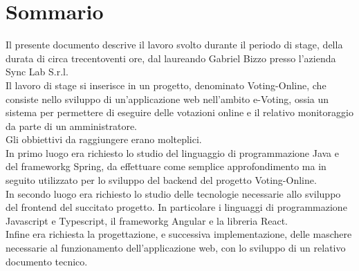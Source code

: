 
\cleardoublepage
{}
{}
\begingroup
\let\clearpage\relax
\let\cleardoublepage\relax
\let\cleardoublepage\relax

\chapter*{Sommario}

Il presente documento descrive il lavoro svolto durante il periodo di stage, della durata di circa trecentoventi ore, dal laureando Gabriel Bizzo presso l'azienda Sync Lab S.r.l. \\
Il lavoro di stage si inserisce in un progetto, denominato Voting-Online, che consiste nello sviluppo di un'applicazione web nell'ambito e-Voting, ossia un sistema per permettere di eseguire delle votazioni online e il relativo monitoraggio da parte di un amministratore. \\
Gli obbiettivi da raggiungere erano molteplici.\\
In primo luogo era richiesto lo studio del linguaggio di programmazione Java e del \gls{frameworkg} Spring, da effettuare come semplice approfondimento ma in seguito utilizzato per lo sviluppo del \gls{backend} del progetto Voting-Online. \\
In secondo luogo era richiesto lo studio delle tecnologie necessarie allo sviluppo del \gls{frontend} del succitato progetto. In particolare i linguaggi di programmazione Javascript e Typescript, il \gls{frameworkg} Angular e la libreria React. \\
Infine era richiesta la progettazione, e successiva implementazione, delle maschere  necessarie al funzionamento dell'applicazione web, con lo sviluppo di un relativo documento tecnico.

%
%

\endgroup			

\vfill


